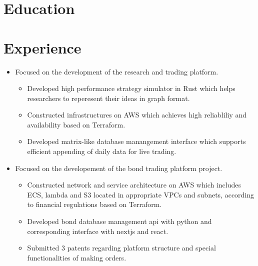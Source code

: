 \documentclass[11pt,a4paper,sans]{moderncv}        %
\begin{document}
\makecvtitle%
\vspace*{-10mm}

\section{Education}
{}

\section{Experience}
{\begin{itemize}%
    \item Focused on the development of the research and trading platform.
        \begin{itemize}%
            \item Developed high performance strategy simulator in Rust which helps researchers to reperesent their ideas in graph format.
            \item Constructed infrastructures on AWS which achieves high reliabliliy and availability based on Terraform.
            \item Developed matrix-like database manangement interface which supports efficient appending of daily data for live trading.
        \end{itemize}
\end{itemize}}

{\begin{itemize}%
    \item Focused on the developement of the bond trading platform project.
        \begin{itemize}%
            \item Constructed network and service architecture on AWS which includes ECS, lambda and S3 located in appropriate VPCs and subnets, according to financial regulations based on Terraform.
            \item Developed bond database management api with python and corresponding interface with nextjs and react.
            \item Submitted 3 patents regarding platform structure and special functionalities of making orders.
        \end{itemize}
\end{itemize}}
\end{document}
